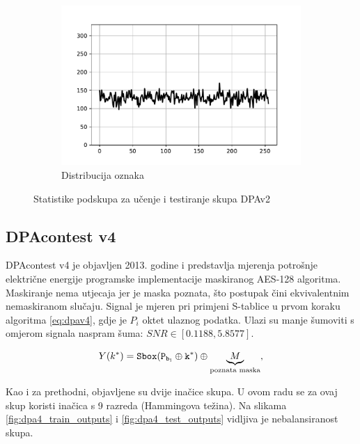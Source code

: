 \documentclass[times, utf8, numeric, diplomski]{fer}
\def\SBOX#1{\tt Sbox(#1)}
\begin{document}
\begin{figure}[H]
\begin{subfigure}{.5\textwidth}
\includegraphics[width=\textwidth]{ds_nl256_ts_outputs.pdf}
\centering
\caption{Distribucija oznaka}
\label{fig:dpa2_test_outputs}
\end{subfigure}
\caption{Statistike podskupa za učenje i testiranje skupa DPAv2}
\end{figure}

\subsection{DPAcontest v4}
DPAcontest v4 je objavljen 2013. godine i predstavlja mjerenja potrošnje električne energije programske implementacije maskiranog AES-128 algoritma. Maskiranje nema utjecaja jer je maska poznata, što postupak čini ekvivalentnim nemaskiranom slučaju. Signal je mjeren pri primjeni S-tablice u prvom koraku algoritma \eqref{eq:dpav4}, gdje je $P_i$ oktet ulaznog podatka. Ulazi su manje šumoviti s omjerom signala naspram šuma: $SNR \in [0.1188, 5.8577]$.

\begin{equation}
\label{eq:dpav4}
Y(k^*) = \SBOX{P_{b_1} \oplus k^{*}} \oplus \underbrace{M}_{\text{poznata maska}},
\end{equation}

Kao i za prethodni, objavljene su dvije inačice skupa. U ovom radu se za ovaj skup koristi inačica s 9 razreda (Hammingova težina). Na slikama \ref{fig:dpa4_train_outputs} i \ref{fig:dpa4_test_outputs} vidljiva je nebalansiranost skupa.
\end{document}
